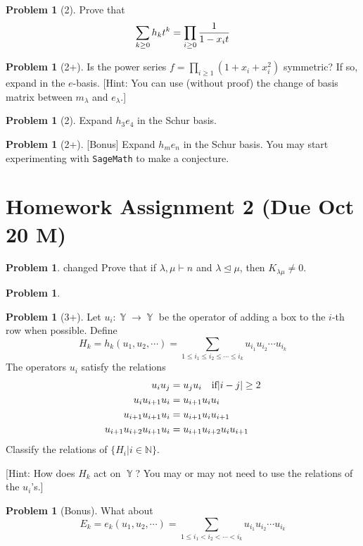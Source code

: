 \documentclass{amsart}
\theoremstyle{plain}
\theoremstyle{definition}
\newtheorem{problem}[theorem]{Problem}
\DeclareMathOperator{\YY}{\mathbb{Y}}
\begin{document}
	\begin{problem}[2]
		Prove that
		\[\sum_{k\geq 0} h_k t^k = \prod_{i\geq0}{1\over 1-x_it}\]
	\end{problem}
	
	\begin{problem}[2+]
		Is the power series $f=\prod_{i\geq 1}(1+x_i+x_i^2)$ symmetric? If so, expand in the $e$-basis. [Hint: You can use (without proof) the change of basis matrix between $m_\lambda$ and $e_\lambda$.]
	\end{problem}
		\begin{problem}[2]
		Expand $h_3e_4$ in the Schur basis. 	
	\end{problem}
	\begin{problem}[2+]
		[Bonus] Expand $h_me_n$ in the Schur basis. You may start experimenting with {\tt{SageMath}} to make a conjecture.
	\end{problem}
	
	
	\section{Homework Assignment 2 (Due Oct 20 M)}
	\begin{problem} {\color{red} changed}
		Prove that if $\lambda,\mu\vdash n$ and $\lambda\trianglelefteq \mu$, then $K_{\lambda\mu}\neq 0$.
	\end{problem}
\begin{problem}
	
\end{problem}

\begin{problem}[3+]
	Let $u_i:\YY\to \YY$ be the operator of adding a box to the $i$-th row when possible. Define 
	\[H_k=h_k(u_1,u_2,\cdots)=\sum_{1\leq i_1\leq i_2\leq\cdots\leq i_k}u_{i_1}u_{i_2}\cdots u_{i_k}\]
	The operators $u_i$ satisfy the relations 
	\begin{align*}
	u_iu_j&=u_ju_i\text{\quad if}|i-j|\geq 2\\
	u_iu_{i+1}u_i&=u_{i+1}u_iu_i\\
	u_{i+1}u_{i+1}u_i&=u_{i+1}u_iu_{i+1}\\
	u_{i+1}u_{i+2}u_{i+1}u_i&=u_{i+1}u_{i+2}u_iu_{i+1}	
	\end{align*}
	Classify the relations of $\{H_i|i\in\mathbb{N}\}$. 
	
	
[Hint: How does $H_k$ act on $\YY$? You may or may not need to use the relations of the $u_i$'s.] 
\end{problem}
\begin{problem}[Bonus] What about 
	$$E_k=e_k(u_1,u_2,\cdots)=\sum_{1\leq i_1<i_2<\cdots<i_k}u_{i_1}u_{i_2}\cdots u_{i_k}$$
\end{problem}
\end{document}
